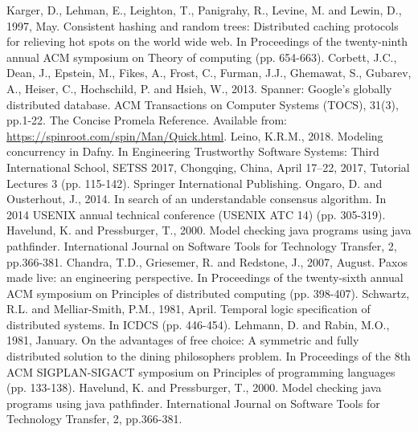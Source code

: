 \begin{thebibliography}{9}
Karger, D., Lehman, E., Leighton, T., Panigrahy, R., Levine, M. and Lewin, D., 1997, May. Consistent hashing and random trees: Distributed caching protocols for relieving hot spots on the world wide web. In Proceedings of the twenty-ninth annual ACM symposium on Theory of computing (pp. 654-663).
Corbett, J.C., Dean, J., Epstein, M., Fikes, A., Frost, C., Furman, J.J., Ghemawat, S., Gubarev, A., Heiser, C., Hochschild, P. and Hsieh, W., 2013. Spanner: Google’s globally distributed database. ACM Transactions on Computer Systems (TOCS), 31(3), pp.1-22.
The Concise Promela Reference.
Available from: \url{https://spinroot.com/spin/Man/Quick.html}.
Leino, K.R.M., 2018. Modeling concurrency in Dafny. In Engineering Trustworthy Software Systems: Third International School, SETSS 2017, Chongqing, China, April 17–22, 2017, Tutorial Lectures 3 (pp. 115-142). Springer International Publishing.
Ongaro, D. and Ousterhout, J., 2014. In search of an understandable consensus algorithm. In 2014 USENIX annual technical conference (USENIX ATC 14) (pp. 305-319).
Havelund, K. and Pressburger, T., 2000. Model checking java programs using java pathfinder. International Journal on Software Tools for Technology Transfer, 2, pp.366-381.
Chandra, T.D., Griesemer, R. and Redstone, J., 2007, August. Paxos made live: an engineering perspective. In Proceedings of the twenty-sixth annual ACM symposium on Principles of distributed computing (pp. 398-407).
Schwartz, R.L. and Melliar-Smith, P.M., 1981, April. Temporal logic specification of distributed systems. In ICDCS (pp. 446-454).
Lehmann, D. and Rabin, M.O., 1981, January. On the advantages of free choice: A symmetric and fully distributed solution to the dining philosophers problem. In Proceedings of the 8th ACM SIGPLAN-SIGACT symposium on Principles of programming languages (pp. 133-138).
Havelund, K. and Pressburger, T., 2000. Model checking java programs using java pathfinder. International Journal on Software Tools for Technology Transfer, 2, pp.366-381.
\end{thebibliography}
